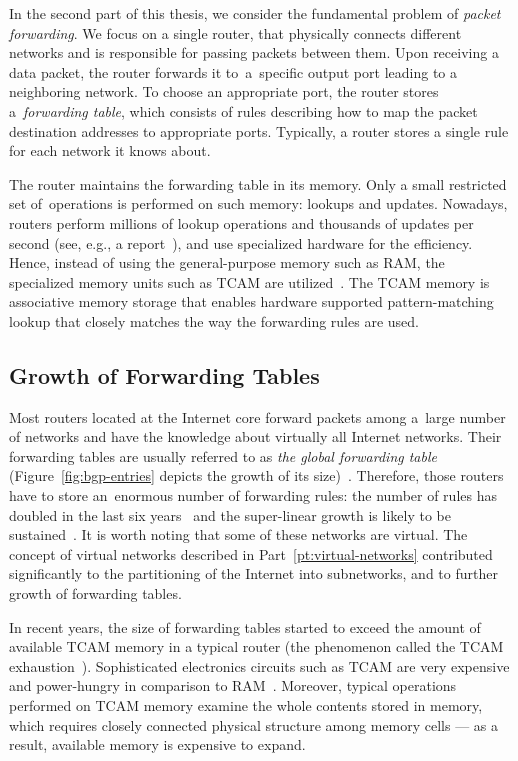 In the second part of this thesis, we consider the fundamental problem of \emph{packet forwarding}.
We focus on a single router, that physically connects different networks and is responsible for passing packets between them.
Upon receiving a data packet, the router forwards it to~a~specific output port leading to a neighboring network.
To choose an appropriate port, the router stores a~\emph{forwarding table}, which consists of rules describing how to map the packet destination addresses to appropriate ports.
Typically, a router stores a single rule for each network it knows about.

The router maintains the forwarding table in its memory.
Only a small restricted set of~operations is performed on such memory: lookups and updates.
Nowadays, routers perform millions of lookup operations and thousands of updates per second (see, e.g., a report~\cite{bgp-updates}), and use specialized hardware for the efficiency.
Hence, instead of using the general-purpose memory such as RAM, the specialized memory units such as TCAM are utilized~\cite{tcam-memory}.
The TCAM memory is associative memory storage that enables hardware supported pattern-matching lookup that closely matches the way the forwarding rules are used.

\subsection{Growth of Forwarding Tables}

Most routers located at the Internet core forward packets among a~large number of networks and have the knowledge about virtually all Internet networks.
Their forwarding tables are usually referred to as \emph{the global forwarding table} (Figure~\ref{fig:bgp-entries} depicts the growth of its size)~\cite{url-bgp-entries}.
Therefore, those routers have to store an~enormous number of forwarding rules: the
number of rules has doubled in the last six years~\cite{bgp-routeviews} and
the super-linear growth is likely to be sustained~\cite{steve-myth}.
It is worth noting that some of these networks are virtual.
The concept of virtual networks described in Part~\ref{pt:virtual-networks} contributed significantly to the partitioning of the Internet into subnetworks, and to further growth of forwarding tables.

In recent years, the size of forwarding tables started to exceed the amount of available TCAM memory in a typical router (the phenomenon called the TCAM exhaustion~\cite{tcam-exhaust}).
Sophisticated electronics circuits such as TCAM are very expensive and power-hungry in comparison to RAM~\cite{tcam-expensive}.
Moreover, typical operations performed on TCAM memory examine the whole contents stored in memory, which requires closely connected physical structure among memory cells --- as a result, available memory is expensive to expand.

